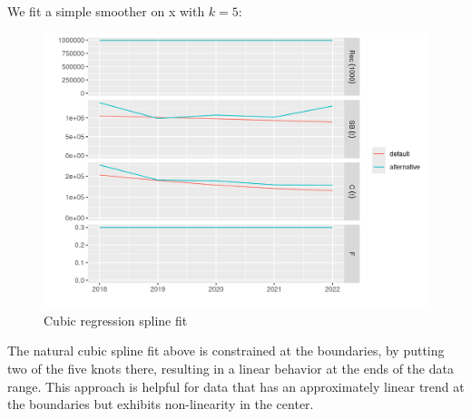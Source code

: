 \documentclass[
]{book}
\newenvironment{Shaded}{\begin{snugshade}}{\end{snugshade}}
\newcommand{\AttributeTok}[1]{\textcolor[rgb]{0.13,0.29,0.53}{#1}}
\newcommand{\CommentTok}[1]{\textcolor[rgb]{0.56,0.35,0.01}{\textit{#1}}}
\newcommand{\DecValTok}[1]{\textcolor[rgb]{0.00,0.00,0.81}{#1}}
\newcommand{\FloatTok}[1]{\textcolor[rgb]{0.00,0.00,0.81}{#1}}
\newcommand{\FunctionTok}[1]{\textcolor[rgb]{0.13,0.29,0.53}{\textbf{#1}}}
\newcommand{\NormalTok}[1]{#1}
\newcommand{\OtherTok}[1]{\textcolor[rgb]{0.56,0.35,0.01}{#1}}
\newcommand{\SpecialCharTok}[1]{\textcolor[rgb]{0.81,0.36,0.00}{\textbf{#1}}}
\newcommand{\StringTok}[1]{\textcolor[rgb]{0.31,0.60,0.02}{#1}}
\begin{document}
We fit a simple smoother on x with \(k = 5\):

\begin{Shaded}
\end{Shaded}

\begin{figure}
\centering
\includegraphics{_bookdown_files/_main_files/figure-html/unnamed-chunk-10-1.png}
\caption{\label{fig:unnamed-chunk-10}Cubic regression spline fit}
\end{figure}

The natural cubic spline fit above is constrained at the boundaries, by putting two of the five knots there, resulting in a linear behavior at the ends of the data range. This approach is helpful for data that has an approximately linear trend at the boundaries but exhibits non-linearity in the center.
\end{document}
